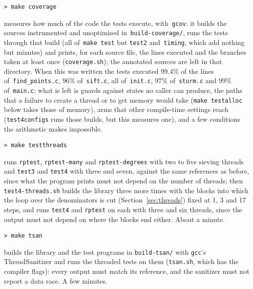 \documentclass[12pt,a4paper,oneside]{amsart}
\begin{document}
\begin{verbatim}
> make coverage
\end{verbatim}
measures how much of the code the tests execute, with~\texttt{gcov}: it
builds the sources instrumented and unoptimised in~\texttt{build-coverage/},
runs the tests through that build (all of~\texttt{make test} but \texttt{test2}
and~\texttt{timing}, which add nothing but minutes) and prints,
for each source file, the lines executed
and the branches taken at least once (\texttt{coverage.sh}); the
annotated sources are left in that directory.
When this was written the tests executed $99.4\%$ of the lines
of~\texttt{find\_points.c}, $96\%$ of~\texttt{sift.c}, all of~\texttt{init.c},
$97\%$ of~\texttt{sturm.c} and $99\%$ of~\texttt{main.c}; what is left is
guards against states no caller can produce, the paths that a failure to
create a thread or to get memory would take (\texttt{make testalloc} below
takes those of memory), arms that other compile-time settings reach
(\texttt{test4configs} runs those builds, but this measures one), and a few
conditions the arithmetic makes impossible.

\begin{verbatim}
> make testthreads
\end{verbatim}
runs \texttt{rptest}, \texttt{rptest-many} and \texttt{rptest-degrees} with
two to five sieving threads and \texttt{test3} and \texttt{test4} with
three and seven, against the same references as before, since what the
program prints must not depend on the number of threads; then
\texttt{test4-threads.sh} builds the library three more times with the
blocks into which the loop over the denominators is cut
(Section~\ref{sec:threads}) fixed at 1, 3 and 17 steps, and runs
\texttt{test4} and \texttt{rptest} on each with three and six threads,
since the output must not depend on where the blocks end either.
About a minute.

\begin{verbatim}
> make tsan
\end{verbatim}
builds the library and the test programs in \texttt{build-tsan/} with
\texttt{gcc}'s ThreadSanitizer and runs the threaded tests on them
(\texttt{tsan.sh}, which has the compiler flags): every output must match
its reference, and the sanitizer must not report a data race. A few minutes.
\end{document}
